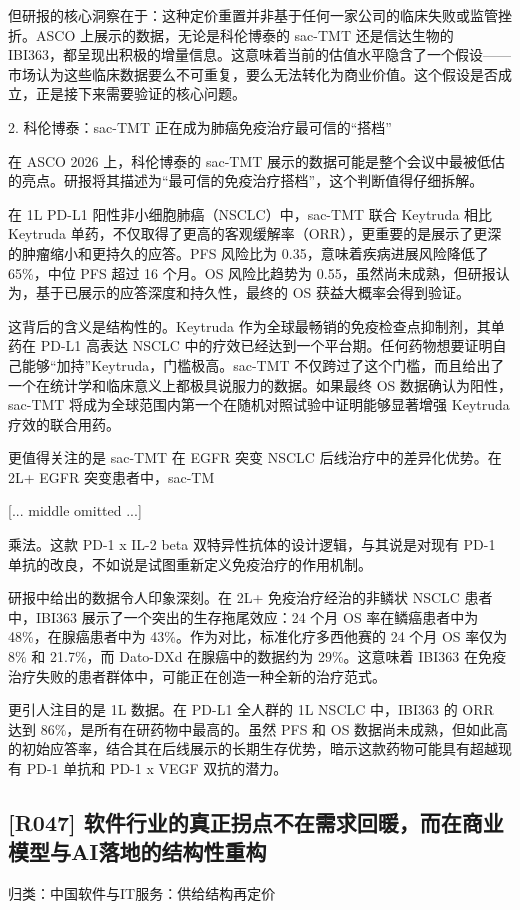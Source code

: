 \documentclass[11pt]{ctexart}
\begin{document}
但研报的核心洞察在于：这种定价重置并非基于任何一家公司的临床失败或监管挫折。ASCO 上展示的数据，无论是科伦博泰的 sac-TMT 还是信达生物的 IBI363，都呈现出积极的增量信息。这意味着当前的估值水平隐含了一个假设——市场认为这些临床数据要么不可重复，要么无法转化为商业价值。这个假设是否成立，正是接下来需要验证的核心问题。

2. 科伦博泰：sac-TMT 正在成为肺癌免疫治疗最可信的“搭档”

在 ASCO 2026 上，科伦博泰的 sac-TMT 展示的数据可能是整个会议中最被低估的亮点。研报将其描述为“最可信的免疫治疗搭档”，这个判断值得仔细拆解。

在 1L PD-L1 阳性非小细胞肺癌（NSCLC）中，sac-TMT 联合 Keytruda 相比 Keytruda 单药，不仅取得了更高的客观缓解率（ORR），更重要的是展示了更深的肿瘤缩小和更持久的应答。PFS 风险比为 0.35，意味着疾病进展风险降低了 65\%，中位 PFS 超过 16 个月。OS 风险比趋势为 0.55，虽然尚未成熟，但研报认为，基于已展示的应答深度和持久性，最终的 OS 获益大概率会得到验证。

这背后的含义是结构性的。Keytruda 作为全球最畅销的免疫检查点抑制剂，其单药在 PD-L1 高表达 NSCLC 中的疗效已经达到一个平台期。任何药物想要证明自己能够“加持”Keytruda，门槛极高。sac-TMT 不仅跨过了这个门槛，而且给出了一个在统计学和临床意义上都极具说服力的数据。如果最终 OS 数据确认为阳性，sac-TMT 将成为全球范围内第一个在随机对照试验中证明能够显著增强 Keytruda 疗效的联合用药。

更值得关注的是 sac-TMT 在 EGFR 突变 NSCLC 后线治疗中的差异化优势。在 2L+ EGFR 突变患者中，sac-TM

[... middle omitted ...]

乘法。这款 PD-1 x IL-2 beta 双特异性抗体的设计逻辑，与其说是对现有 PD-1 单抗的改良，不如说是试图重新定义免疫治疗的作用机制。

研报中给出的数据令人印象深刻。在 2L+ 免疫治疗经治的非鳞状 NSCLC 患者中，IBI363 展示了一个突出的生存拖尾效应：24 个月 OS 率在鳞癌患者中为 48\%，在腺癌患者中为 43\%。作为对比，标准化疗多西他赛的 24 个月 OS 率仅为 8\% 和 21.7\%，而 Dato-DXd 在腺癌中的数据约为 29\%。这意味着 IBI363 在免疫治疗失败的患者群体中，可能正在创造一种全新的治疗范式。

更引人注目的是 1L 数据。在 PD-L1 全人群的 1L NSCLC 中，IBI363 的 ORR 达到 86\%，是所有在研药物中最高的。虽然 PFS 和 OS 数据尚未成熟，但如此高的初始应答率，结合其在后线展示的长期生存优势，暗示这款药物可能具有超越现有 PD-1 单抗和 PD-1 x VEGF 双抗的潜力。

\subsection{[R047] 软件行业的真正拐点不在需求回暖，而在商业模型与AI落地的结构性重构}
{\small\color{refgray}归类：中国软件与IT服务：供给结构再定价}
\end{document}
